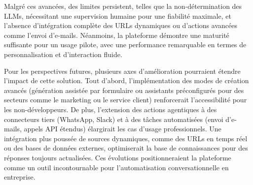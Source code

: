 Malgré ces avancées, des limites persistent, telles que la non-détermination des LLMs, nécessitant une supervision humaine pour une fiabilité maximale, et l'absence d'intégration complète des URLs dynamiques ou d'actions avancées comme l'envoi d'e-mails. Néanmoins, la plateforme démontre une maturité suffisante pour un usage pilote, avec une performance remarquable en termes de personnalisation et d'interaction fluide.\par
Pour les perspectives futures, plusieurs axes d'amélioration pourraient étendre l'impact de cette solution. Tout d'abord, l'implémentation des modes de création avancés (génération assistée par formulaire ou assistants préconfigurés pour des secteurs comme le marketing ou le service client) renforcerait l'accessibilité pour les non-développeurs. De plus, l'extension des actions agentiques à des connecteurs tiers (WhatsApp, Slack) et à des tâches automatisées (envoi d'e-mails, appels API étendus) élargirait les cas d'usage professionnels. Une intégration plus poussée de sources dynamiques, comme des URLs en temps réel ou des bases de données externes, optimiserait la base de connaissances pour des réponses toujours actualisées. Ces évolutions positionneraient la plateforme comme un outil incontournable pour l'automatisation conversationnelle en entreprise.